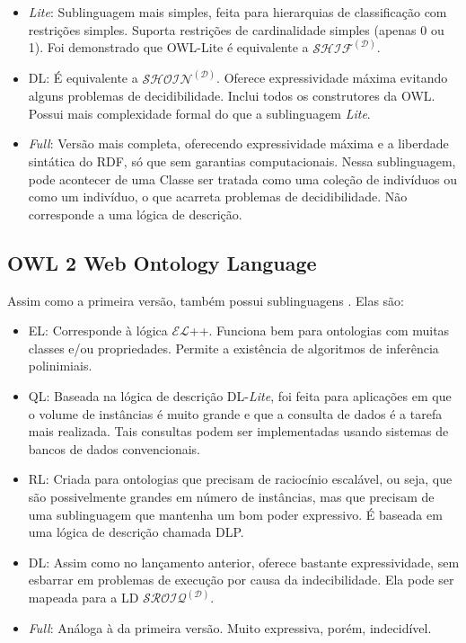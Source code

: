 \begin{itemize}
	\item \textit{Lite}: Sublinguagem mais simples, feita para hierarquias de classificação com restrições simples. Suporta restrições de cardinalidade simples (apenas 0 ou 1).  Foi demonstrado que OWL-Lite é equivalente a $ \mathcal{SHIF^{(D)}} $.
	\item DL: É equivalente a $ \mathcal{SHOIN^{(D)}} $. Oferece expressividade máxima evitando alguns problemas de decidibilidade. Inclui todos os construtores da OWL. Possui mais complexidade formal do que a sublinguagem \textit{Lite}.
	\item \textit{Full}: Versão mais completa, oferecendo expressividade máxima e a liberdade sintática do RDF, só que sem garantias computacionais. Nessa sublinguagem, pode acontecer de uma Classe ser tratada como uma coleção de indivíduos ou como um indivíduo, o que acarreta problemas de decidibilidade. Não corresponde a uma lógica de descrição.
\end{itemize}

\subsection{OWL 2 Web Ontology Language}

Assim como a primeira versão, também possui sublinguagens \cite{ferramentasOWL2}. Elas são:

\begin{itemize}
	\item EL: Corresponde à lógica $ \mathcal{EL} $++. Funciona bem para ontologias com muitas classes e/ou propriedades. Permite a existência de algoritmos de inferência polinimiais.
	\item QL: Baseada na lógica de descrição DL-\textit{Lite}, foi feita para aplicações em que o volume de instâncias é muito grande e que a consulta de dados é a tarefa mais realizada. Tais consultas podem ser implementadas usando sistemas de bancos de dados convencionais.
	\item RL: Criada para ontologias que precisam de raciocínio escalável, ou seja, que são possivelmente grandes em número de instâncias, mas que precisam de uma sublinguagem que mantenha um bom poder expressivo. É baseada em uma lógica de descrição chamada DLP.
	\item DL: Assim como no lançamento anterior, oferece bastante expressividade, sem esbarrar em problemas de execução por causa da indecibilidade. Ela pode ser mapeada para a LD $ \mathcal{SROIQ^{(D)}} $. 
	\item \textit{Full}: Análoga à da primeira versão. Muito expressiva, porém, indecidível.
\end{itemize}

